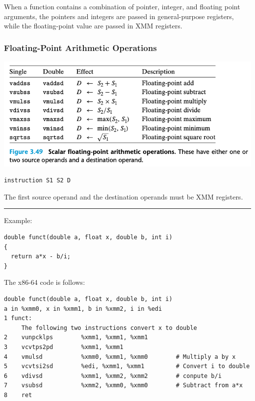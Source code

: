 \documentclass[11pt]{article}
\begin{document}
When a function contains a combination of pointer, integer, and floating point arguments, the pointers and integers are passed in general-purpose registers, while the floating-point value are passed in XMM registers.\\


\subsubsection{Floating-Point Arithmetic Operations}
\label{sec:org740e223}

\begin{center}
\includegraphics[width=.9\linewidth]{pics/scalar-floating-point-arithmetic-operations.png}
\end{center}
\begin{verbatim}
instruction S1 S2 D
\end{verbatim}

The first source operand and the destination operands must be XMM registers.\\

\noindent\rule{\textwidth}{0.5pt}
Example:\\
\begin{verbatim}
double funct(double a, float x, double b, int i)
{
  return a*x - b/i;
}
\end{verbatim}

The x86-64 code is follows:\\
\begin{verbatim}
double funct(double a, float x, double b, int i)
a in %xmm0, x in %xmm1, b in %xmm2, i in %edi
1 funct:
     The following two instructions convert x to double
2    vunpcklps        %xmm1, %xmm1, %xmm1
3    vcvtps2pd        %xmm1, %xmm1
4    vmulsd           %xmm0, %xmm1, %xmm0        # Multiply a by x
5    vcvtsi2sd        %edi, %xmm1, %xmm1         # Convert i to double
6    vdivsd           %xmm1, %xmm2, %xmm2        # conpute b/i
7    vsubsd           %xmm2, %xmm0, %xmm0        # Subtract from a*x
8    ret
\end{verbatim}
\end{document}

